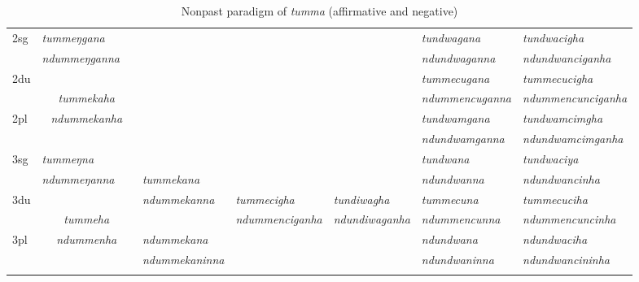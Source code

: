 \begin{landscape}
\begin{table}[p]
{{\begin{tabular}{l|p{2.4cm}|p{2.0cm}|p{2.6cm}|p{2.8cm}|p{2.6cm}|p{3.2cm}|p{3.2cm}}
\hline				
{\sc 2sg} 		&	\emph{tummeŋgana}  &	    & \multicolumn{3}{c|}{ \cellcolor[gray]{.8}}& \emph{tundwagana}  &   \emph{tundwacigha}\\
		&  \emph{ndummeŋganna} &  & \multicolumn{3}{c|}{ \cellcolor[gray]{.8}}&\emph{ ndundwaganna} &\emph{ndundwanciganha}  \\
 \cline{1-2} \cline{7-8}			
{\sc 2du}		&	\multicolumn{2}{c|}{}     & \multicolumn{3}{c|}{\cellcolor[gray]{.8}} & \emph{tummecugana}  &  \emph{tummecucigha} \\
		&  	\multicolumn{2}{c|}{\emph{tummekaha}} & \multicolumn{3}{c|}{\cellcolor[gray]{.8} }&\emph{ndummencuganna}  & \emph{ndummencunciganha} \\
 \cline{1-1} \cline{7-8}			
{\sc 2pl}		&	\multicolumn{2}{c|}{\emph{ndummekanha}} & \multicolumn{3}{c|}{ \cellcolor[gray]{.8}}& \emph{tundwamgana}& \emph{tundwamcimgha}  \\
		&	\multicolumn{2}{c|}{ }& \multicolumn{3}{c|}{\cellcolor[gray]{.8}}&\emph{ ndundwamganna} & \emph{ndundwamcimganha} \\
\hline			
{\sc 3sg} 		&\emph{tummeŋna}	  &	      	&  			&    &    	&\emph{tundwana}&\emph{tundwaciya}\\
		& \emph{ndummeŋanna}   &   	& \emph{tummekana}	&  &   &\emph{ndundwanna}&\emph{ndundwancinha}\\
  \cline{1-2}  \cline{7-8}					
{\sc 3du}& \multicolumn{2}{c|}{}&\emph{ndummekanna}& \emph{tummecigha}&\emph{tundiwagha}&  \emph{tummecuna} & \emph{ tummecuciha}\\
	& \multicolumn{2}{c|}{\emph{tummeha}}& &\emph{ndummenciganha}& \emph{ndundiwaganha} & \emph{ndummencunna} & \emph{ndummencuncinha}\\
 \cline{1-1} \cline{4-4} \cline{7-8}	
{\sc 3pl}&\multicolumn{2}{c|}{\emph{ndummenha}}	&\emph{ndummekana}& & &\emph{ndundwana}&\emph{ndundwaciha}\\	
	&\multicolumn{2}{c|}{ }&\emph{ndummekaninna}&& &\emph{ndundwaninna}&\emph{ndundwancininha} \\
\lspbottomrule
\end{tabular}
}
}
\caption{Nonpast paradigm of \emph{tumma}  (affirmative and negative)}\label{par-tund-npst}
\end{table}




\end{landscape}
